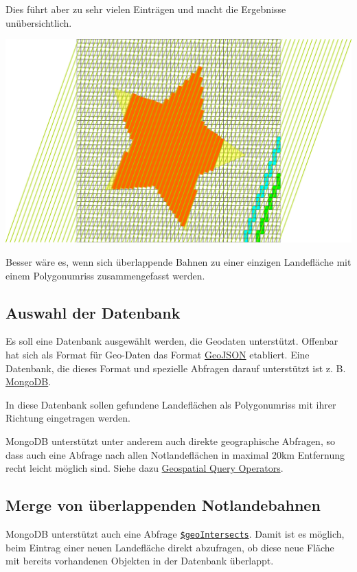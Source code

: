 \documentclass[
11pt, %
a4paper, %
oneside, %
pdfspacing, %
headinclude,
BCOR5mm, %
ngerman, %
bibtotocnumbered,
]{scrartcl}
\begin{document}
Dies führt aber zu sehr vielen Einträgen und macht die Ergebnisse unübersichtlich.

\includegraphics[width=\textwidth]{./drawings/ueberlappendeBahnen.png}

Besser wäre es, wenn sich überlappende Bahnen zu einer einzigen Landefläche mit einem Polygonumriss zusammengefasst werden. 

\subsection{Auswahl der Datenbank}

Es soll eine Datenbank ausgewählt werden, die Geodaten unterstützt. Offenbar hat sich als Format für Geo-Daten das Format \href{http://geojson.org/}{GeoJSON} etabliert. Eine Datenbank, die dieses Format und spezielle Abfragen darauf unterstützt ist z. B. \href{https://docs.mongodb.com/}{MongoDB}.

In diese Datenbank sollen gefundene Landeflächen als Polygonumriss mit ihrer Richtung eingetragen werden.

MongoDB unterstützt unter anderem auch direkte geographische Abfragen, so dass auch eine Abfrage nach allen Notlandeflächen in maximal 20km Entfernung recht leicht möglich sind. Siehe dazu \href{https://docs.mongodb.com/manual/reference/operator/query-geospatial/}{Geospatial Query Operators}.

\subsection{Merge von überlappenden Notlandebahnen}

MongoDB unterstützt auch eine Abfrage \href{https://docs.mongodb.com/manual/reference/operator/query/geoIntersects/#op._S_geoIntersects}{\texttt{\$geoIntersects}}. Damit ist es möglich, beim Eintrag einer neuen Landefläche direkt abzufragen, ob diese neue Fläche mit bereits vorhandenen Objekten in der Datenbank überlappt. 
\end{document}
